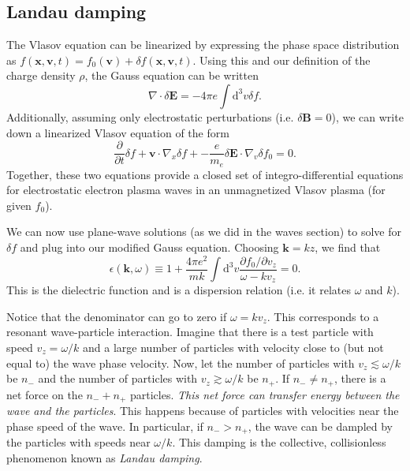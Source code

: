 	\subsection{Landau damping}

	The Vlasov equation can be linearized by expressing the phase space distribution as $f(\mathbf{x},\mathbf{v},t) = f_0(\mathbf{v}) + \delta f(\mathbf{x},\mathbf{v},t)$. Using this and our definition of the charge density $\rho$, the Gauss equation can be written
	\begin{equation}
		\nabla\cdot\delta\mathbf{E} = -4\pi e\int\mathrm{d}^3v\delta f.
	\end{equation}
	Additionally, assuming only electrostatic perturbations (i.e. $\delta\mathbf{B}=0$), we can write down a linearized Vlasov equation of the form
	\begin{equation}
		\frac{\partial}{\partial t}\delta f + \mathbf{v}\cdot\nabla_x\delta f + -\frac{e}{m_e}\delta\mathbf{E}\cdot\nabla_v\delta f_0 = 0.
	\end{equation}
	Together, these two equations provide a closed set of integro-differential equations for electrostatic electron plasma waves in an unmagnetized Vlasov plasma (for given $f_0$).

	We can now use plane-wave solutions (as we did in the waves section) to solve for $\delta f$ and plug into our modified Gauss equation. Choosing $\mathbf{k}=k\hat{z}$, we find that
	\begin{equation}
	\epsilon(\mathbf{k},\omega)\equiv 1 +\frac{4\pi e^2}{mk}\int\mathrm{d}^3v\frac{\partial f_0/\partial v_z}{\omega - kv_z} = 0.
	\end{equation}
	This is the dielectric function and is a dispersion relation (i.e. it relates $\omega$ and $k$).

	Notice that the denominator can go to zero if $\omega=kv_z$. This corresponds to a resonant wave-particle interaction. Imagine that there is a test particle with speed $v_z=\omega/k$ and a large number of particles with velocity close to (but not equal to) the wave phase velocity. Now, let the number of particles with $v_z\lesssim\omega/k$ be $n_{-}$ and the number of particles with $v_z\gtrsim\omega/k$ be $n_{+}$. If $n_-\neq n_+$, there is a net force on the $n_-+n_+$ particles. \textit{This net force can transfer energy between the wave and the particles}. This happens because of particles with velocities near the phase speed of the wave. In particular, if $n_->n_+$, the wave can be dampled by the particles with speeds near $\omega/k$. This damping is the collective, collisionless phenomenon known as \textit{Landau damping}.

